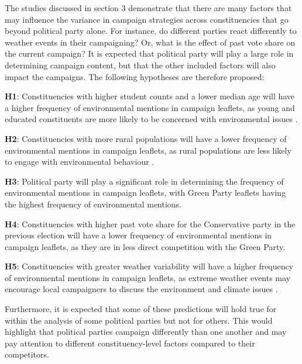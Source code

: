 \documentclass[preprint,12pt,authoryear]{elsarticle}
\begin{document}
The studies discussed in section 3 demonstrate that there are many factors that may influence the variance in campaign strategies across constituencies that go beyond political party alone. For instance, do different parties react differently to weather events in their campaigning? Or, what is the effect of past vote share on the current campaign? It is expected that political party will play a large role in determining campaign content, but that the other included factors will also impact the campaigns. The following hypotheses are therefore proposed:


\textbf{\hypertarget{H1}{H1}}: Constituencies with higher student counts and a lower median age will have a higher frequency of environmental mentions in campaign leaflets, as young and educated constituents are more likely to be concerned with environmental issues \citep{klinebergDemographicPredictorsEnvironmental1998}.

\textbf{\hypertarget{H2}{H2}}: Constituencies with more rural populations will have a lower frequency of environmental mentions in campaign leaflets, as rural populations are less likely to engage with environmental behaviour \citep{freudenburgRuralUrbanDifferencesEnvironmental1991}.

\textbf{\hypertarget{H3}{H3}}: Political party will play a significant role in determining the frequency of environmental mentions in campaign leaflets, with Green Party leaflets having the highest frequency of environmental mentions.

\textbf{\hypertarget{H4}{H4}}: Constituencies with higher past vote share for the Conservative party in the previous election will have a lower frequency of environmental mentions in campaign leaflets, as they are in less direct competition with the Green Party.

\textbf{\hypertarget{H5}{H5}}: Constituencies with greater weather variability will have a higher frequency of environmental mentions in campaign leaflets, as extreme weather events may encourage local campaigners to discuss the environment and climate issues \citep{koniskyExtremeWeatherEvents2016}.


Furthermore, it is expected that some of these predictions will hold true for within the analysis of some political parties but not for others. This would highlight that political parties campaign differently than one another and may pay attention to different constituency-level factors compared to their competitors.

	
\end{document}
